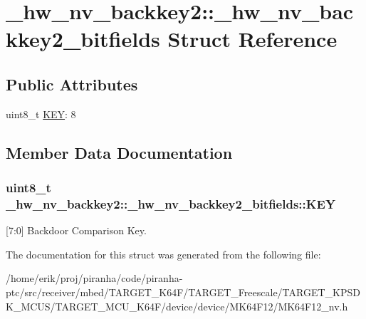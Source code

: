 \hypertarget{struct__hw__nv__backkey2_1_1__hw__nv__backkey2__bitfields}{}\section{\+\_\+hw\+\_\+nv\+\_\+backkey2\+:\+:\+\_\+hw\+\_\+nv\+\_\+backkey2\+\_\+bitfields Struct Reference}
\label{struct__hw__nv__backkey2_1_1__hw__nv__backkey2__bitfields}
\subsection*{Public Attributes}
\begin{DoxyCompactItemize}
\item 
uint8\+\_\+t \hyperlink{struct__hw__nv__backkey2_1_1__hw__nv__backkey2__bitfields_ac51433d38d0f913c95ea0806a65af335}{K\+EY}\+: 8
\end{DoxyCompactItemize}


\subsection{Member Data Documentation}
\subsubsection[{\texorpdfstring{K\+EY}{KEY}}]{\setlength{\rightskip}{0pt plus 5cm}uint8\+\_\+t \+\_\+hw\+\_\+nv\+\_\+backkey2\+::\+\_\+hw\+\_\+nv\+\_\+backkey2\+\_\+bitfields\+::\+K\+EY}\hypertarget{struct__hw__nv__backkey2_1_1__hw__nv__backkey2__bitfields_ac51433d38d0f913c95ea0806a65af335}{}\label{struct__hw__nv__backkey2_1_1__hw__nv__backkey2__bitfields_ac51433d38d0f913c95ea0806a65af335}
\mbox{[}7\+:0\mbox{]} Backdoor Comparison Key. 

The documentation for this struct was generated from the following file\+:\begin{DoxyCompactItemize}
\item 
/home/erik/proj/piranha/code/piranha-\/ptc/src/receiver/mbed/\+T\+A\+R\+G\+E\+T\+\_\+\+K64\+F/\+T\+A\+R\+G\+E\+T\+\_\+\+Freescale/\+T\+A\+R\+G\+E\+T\+\_\+\+K\+P\+S\+D\+K\+\_\+\+M\+C\+U\+S/\+T\+A\+R\+G\+E\+T\+\_\+\+M\+C\+U\+\_\+\+K64\+F/device/device/\+M\+K64\+F12/M\+K64\+F12\+\_\+nv.\+h\end{DoxyCompactItemize}
